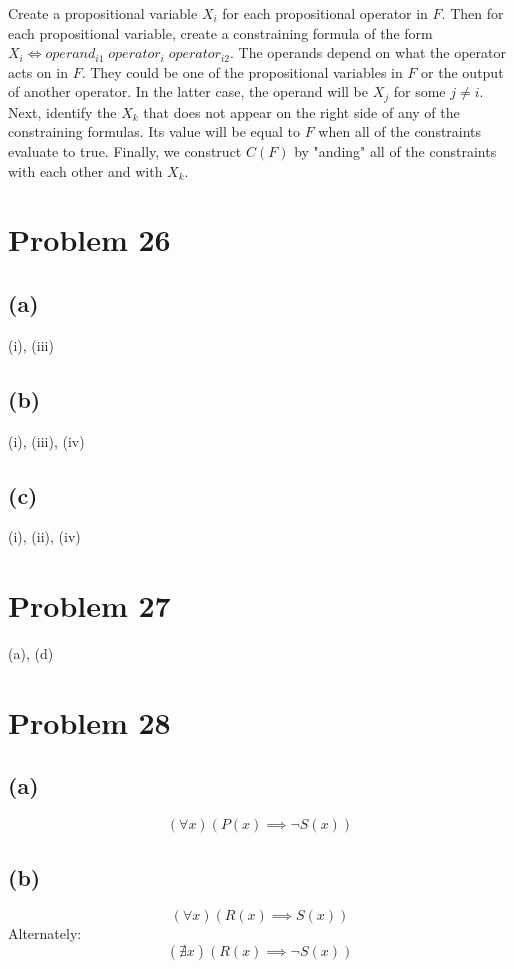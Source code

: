 \documentclass{article}
\begin{document}
Create a propositional variable $X_i$ for each propositional operator in $F$. Then for each propositional variable, create a constraining formula of the form $X_i \iff operand_{i1} \; operator_i \; operator_{i2}$. The operands depend on what the operator acts on in $F$. They could be one of the propositional variables in $F$ or the output of another operator. In the latter case, the operand will be $X_j$ for some $j \ne i$. Next, identify the $X_k$ that does not appear on the right side of any of the constraining formulas. Its value will be equal to $F$ when all of the constraints evaluate to true. Finally, we construct $C(F)$ by "anding" all of the constraints with each other and with $X_k$.

\pagebreak

\section{Problem 26}
\subsection{(a)}
(i), (iii)

\subsection{(b)}
(i), (iii), (iv)

\subsection{(c)}
(i), (ii), (iv)

\pagebreak

\section{Problem 27}
 (a), (d)

\pagebreak

\section{Problem 28}
\subsection{(a)}
\[
	(\forall x)(P(x) \implies \neg S(x))
\]
\subsection{(b)}
\[
	(\forall x)(R(x) \implies S(x))
\]
Alternately:
\[
	(\nexists x)(R(x) \implies \neg S(x))
\]
\end{document}
